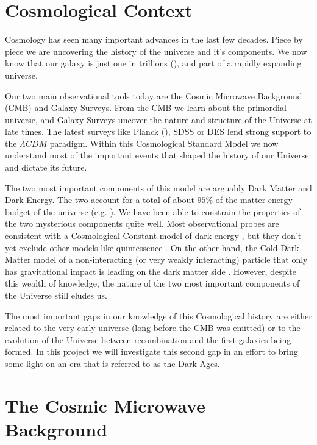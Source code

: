 
\section{Cosmological Context}

Cosmology has seen many important advances in the last few decades. Piece by piece we are uncovering the history of the universe and it's components. We now know that our galaxy is just one in trillions (\cite{2016ApJ...830...83C}), and part of a rapidly expanding universe.

Our two main observational tools today are the Cosmic Microwave Background (CMB) and Galaxy Surveys. From the CMB we learn about the primordial universe, and Galaxy Surveys uncover the nature and structure of the Universe at late times. The latest surveys like Planck (\cite{2016A&A...594A..13P}), SDSS  or DES  lend strong support to the $\Lambda CDM$ paradigm. Within this Cosmological Standard Model we now understand most of the important events that shaped the history of our Universe and dictate its future. 

The two most important components of this model are arguably Dark Matter and Dark Energy. The two account for a total of about $95\%$ of the matter-energy budget of the universe (e.g. \cite{2016A&A...594A..13P}). We have been able to constrain the properties of the two mysterious components quite well. Most observational probes are consistent with a Cosmological Constant model of dark energy , but they don't yet exclude other models like quintessence . On the other hand, the Cold Dark Matter model of a non-interacting (or very weakly interacting) particle that only has gravitational impact is leading on the dark matter side . However, despite this wealth of knowledge, the nature of the two most important components of the Universe still eludes us.

The most important gaps in our knowledge of this Cosmological history are either related to the very early universe (long before the CMB was emitted) or to the evolution of the Universe between recombination and the first galaxies being formed. In this project we will investigate this second gap in an effort to bring some light on an era that is referred to as the Dark Ages. 

\section{The Cosmic Microwave Background}

